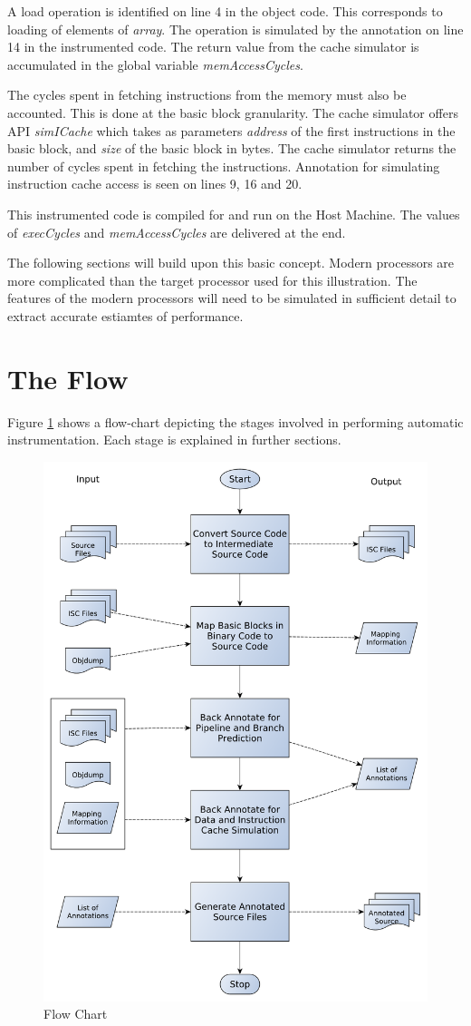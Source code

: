 A load operation is identified on line 4 in the object code. This corresponds to loading of elements of \emph{array}. The operation is simulated by the annotation on line 14 in the instrumented code. The return value from the cache simulator is accumulated in the global variable \emph{memAccessCycles}.

The cycles spent in fetching instructions from the memory must also be accounted. This is done at the basic block granularity. The cache simulator offers API \emph{simICache} which takes as parameters \emph{address} of the first instructions in the basic block, and \emph{size} of the basic block in bytes. The cache simulator returns the number of cycles spent in fetching the instructions. Annotation for simulating instruction cache access is seen on lines 9, 16 and 20.

This instrumented code is compiled for and run on the Host Machine. The values of \emph{execCycles} and \emph{memAccessCycles} are delivered at the end. 

The following sections will build upon this basic concept. Modern processors are more complicated than the target processor used for this illustration. The features of the modern processors will need to be simulated in sufficient detail to extract accurate estiamtes of performance.

\section{The Flow}

Figure \ref{fig:hcsFlowChart} shows a flow-chart depicting the stages involved in performing automatic instrumentation. Each stage is explained in further sections.

\begin{figure}[h!]
\center
\includegraphics[width=.75\textwidth]{figures/HCS_FlowChart.pdf}
\caption{Flow Chart}
\label{fig:hcsFlowChart}
\end{figure}


